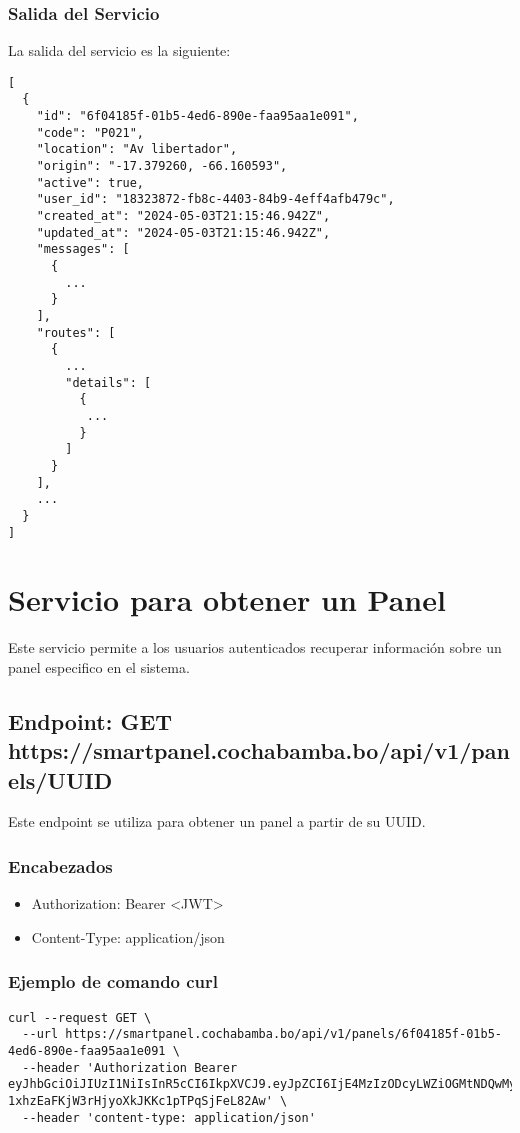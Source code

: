\documentclass{article}
\begin{document}
\subsubsection{Salida del Servicio}

La salida del servicio es la siguiente:

\begin{verbatim}
[
  {
    "id": "6f04185f-01b5-4ed6-890e-faa95aa1e091",
    "code": "P021",
    "location": "Av libertador",
    "origin": "-17.379260, -66.160593",
    "active": true,
    "user_id": "18323872-fb8c-4403-84b9-4eff4afb479c",
    "created_at": "2024-05-03T21:15:46.942Z",
    "updated_at": "2024-05-03T21:15:46.942Z",
    "messages": [
      {
        ...
      }
    ],
    "routes": [
      {
        ...
        "details": [
          {
           ...
          }
        ]
      }
    ],
    ...
  }
]
\end{verbatim}
\newpage

\section{Servicio para obtener un Panel}

Este servicio permite a los usuarios autenticados recuperar información sobre un panel especifico en el sistema.

\subsection{Endpoint: GET https://smartpanel.cochabamba.bo/api/v1/panels/UUID }

Este endpoint se utiliza para obtener un panel a partir de su UUID.

\subsubsection{Encabezados}

\begin{itemize}
\item Authorization: Bearer \textless JWT\textgreater
\item Content-Type: application/json
\end{itemize}

\subsubsection{Ejemplo de comando curl}

\begin{verbatim}
curl --request GET \
  --url https://smartpanel.cochabamba.bo/api/v1/panels/6f04185f-01b5-4ed6-890e-faa95aa1e091 \
  --header 'Authorization Bearer eyJhbGciOiJIUzI1NiIsInR5cCI6IkpXVCJ9.eyJpZCI6IjE4MzIzODcyLWZiOGMtNDQwMy04NGI5LTRlZmY0YWZiNDc5YyIsImlhdCI6MTcxNTA4OTc2NCwiZXhwIjoxNzE5MTMyOTY0fQ.cSuOuf-1xhzEaFKjW3rHjyoXkJKKc1pTPqSjFeL82Aw' \
  --header 'content-type: application/json'
\end{verbatim}
\end{document}
